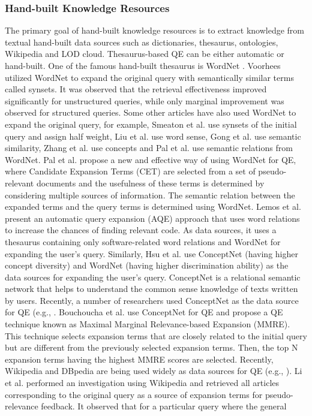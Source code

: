 \subsubsection{Hand-built Knowledge Resources}
The primary goal of hand-built knowledge resources is to extract knowledge from textual hand-built data sources such as dictionaries, thesaurus, ontologies, Wikipedia and LOD cloud. Thesaurus-based QE can be either automatic or hand-built. One of the famous hand-built thesaurus is WordNet \cite{miller1990introduction}. Voorhees \cite{voorhees1994query} utilized WordNet to expand the original query with semantically similar terms called synsets. It was observed that the retrieval effectiveness  improved significantly for unstructured queries, while only marginal improvement was observed for structured queries. Some other articles have also used WordNet to expand the original query, for example,  Smeaton et al. \cite{smeaton1995trec} use synsets of the initial query and assign half weight, Liu et al. \cite{liu2004effective} use word sense, Gong et al. \cite{gong2006multi} use semantic similarity, Zhang et al. \cite{zhang2009concept} use concepts and Pal et al. \cite{pal2014improving} use semantic relations from WordNet. Pal et al. \cite{pal2014improving} propose a new and effective way of using WordNet for QE, where Candidate Expansion Terms (CET) are selected from a set of pseudo-relevant documents and the usefulness of these terms is determined by considering multiple sources of information. The semantic relation between the expanded terms and the query terms is determined using WordNet. Lemos et al. \cite{lemos2014thesaurus} present an automatic query expansion (AQE) approach that uses word relations to increase the chances of finding relevant code. As data sources, it uses a thesaurus containing only software-related word relations and WordNet for expanding the user's query. Similarly, Hsu et al. \cite{hsu2006query} use ConceptNet \cite{liu2004conceptnet} (having higher concept diversity) and WordNet (having higher discrimination ability) as the data sources for expanding the user's query. ConceptNet is a relational semantic network that helps to understand the common sense knowledge of texts written by users. Recently, a number of researchers used ConceptNet as the data source for QE (e.g., \cite{hsu2008combining,kotov2012tapping,bouchoucha2013diversified,anand2015empirical}. Bouchoucha et al. \cite{bouchoucha2013diversified} use ConceptNet for QE and propose a QE technique known as Maximal Marginal Relevance-based Expansion (MMRE). This technique selects expansion terms that are closely related to the initial query but are  different from the previously selected expansion terms. Then, the top N expansion terms having the highest MMRE scores are selected. Recently, Wikipedia and DBpedia are being used widely as data sources for QE (e.g., \cite{li2007improving,arguello2008document,xu2009query,aggarwal2012query,almasri2013wikipedia,anand2015empirical,guisado2016query}). Li et al. \cite{li2007improving} performed an investigation using Wikipedia and retrieved all articles corresponding to the original query as a source of expansion terms for pseudo-relevance feedback. It observed that for a particular query where the general 